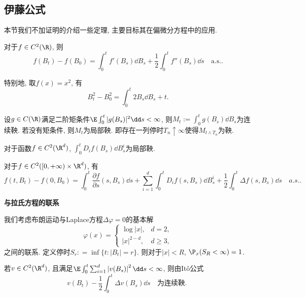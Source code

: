 \documentclass[a4paper, 10pt]{ctexart}
\begin{document}
\subsection{伊藤公式}

\noindent
本节我们不加证明的介绍一些定理, 主要目标其在偏微分方程中的应用. 

\begin{theorem}[一维Itô公式]
	对于$f \in C^2(\R)$, 则 
	\begin{equation}\label{eq:1dIto}
		f(B_t) - f(B_0)
		= \int_0^t f'(B_s) \dd B_s + \frac{1}{2} \int_0^t f''(B_s) \dd s \quad \text{a.s.}.
	\end{equation}
\end{theorem}
\begin{corollary}
	特别地, 取$f(x) = x^2$, 有
	\begin{equation}\label{eq:1dIto'}
		B_t^2 - B_0^2 = \int_0^t 2 B_s \dd B_s + t. 
	\end{equation}
\end{corollary}

\begin{theorem}
	设$g \in C(\R)$满足二阶矩条件$\E \int_0^t |g(B_s)|^2 \dd s < \infty$, 则$M_t := \int_0^t g(B_s) \dd B_s$为连续鞅. 
	若没有矩条件, 则$M_t$为局部鞅. 
	即存在一列停时$T_n \uparrow \infty$使得$M_{t \wedge T_n}$为鞅. 
\end{theorem}

\begin{corollary}\label{thm:IntLocalMartingaleProperty}
	对于函数$f \in C^2(\R^d)$, $\int_0^t D_i f(B_s) \dd B_s^i$为局部鞅. 
\end{corollary}


\begin{theorem}[高维Itô公式]
	对于$f \in C^2([0, +\infty) \times \R^d)$, 有
	\begin{equation*}
		f(t, B_t) - f(0, B_0)
		= \int_0^t \frac{\partial f}{\partial s}(s, B_s) \dd s 
		+ \sum_{i=1}^d \int_0^t D_i f(s, B_s) \dd B_s^i 
		+ \frac{1}{2} \int_0^t \Delta f(s, B_s) \dd s 
		\quad a.s..
	\end{equation*}
\end{theorem}


\noindent\textbf{\keben \large 与拉氏方程的联系}



\noindent
我们考虑布朗运动与Laplace方程$\Delta \varphi = 0$的基本解
\begin{equation*}
	\varphi(x) = 
	\begin{cases}
		\log |x|, & d = 2, \\
		|x|^{2-d}, & d \geq 3, 
	\end{cases}
\end{equation*}
之间的联系. 
定义停时$S_r : = \inf \{ t \colon |B_t| = r \}$. 
则对于$|x| < R$, $\P_x(S_R < \infty) = 1$. 
\begin{lemma}
	若$v \in C^2(\R^d)$, 且满足$\E \int_0^t \sum_{i=1}^d \left| v(B_s) \right|^2 \dd s < \infty$, 则由Itô公式
	\begin{equation*}
		v(B_t) - \frac12 \int_0^t \Delta v(B_s) \dd s \quad\text{为连续鞅. }
	\end{equation*}
\end{lemma}
\end{document}

